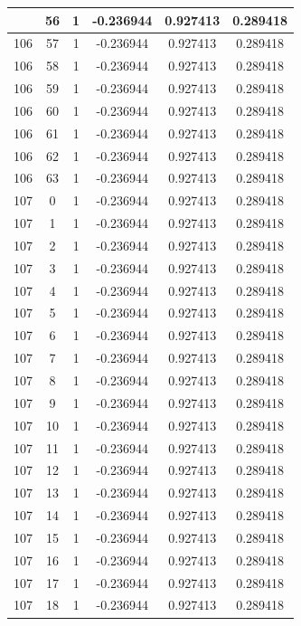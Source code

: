 \documentclass[12pt,a4paper]{article}
\numberwithin{equation}{section}
\numberwithin{figure}{section}
\numberwithin{table}{section}
\begin{document}
\begin{longtable}{|c|c|c|c|c|c|}
\pagebreak
106 & 56 & 1 & -0.236944 & 0.927413 & 0.289418 \\ \hline
106 & 57 & 1 & -0.236944 & 0.927413 & 0.289418 \\ \hline
106 & 58 & 1 & -0.236944 & 0.927413 & 0.289418 \\ \hline
106 & 59 & 1 & -0.236944 & 0.927413 & 0.289418 \\ \hline
106 & 60 & 1 & -0.236944 & 0.927413 & 0.289418 \\ \hline
106 & 61 & 1 & -0.236944 & 0.927413 & 0.289418 \\ \hline
106 & 62 & 1 & -0.236944 & 0.927413 & 0.289418 \\ \hline
106 & 63 & 1 & -0.236944 & 0.927413 & 0.289418 \\ \hline
107 & 0 & 1 & -0.236944 & 0.927413 & 0.289418 \\ \hline
107 & 1 & 1 & -0.236944 & 0.927413 & 0.289418 \\ \hline
107 & 2 & 1 & -0.236944 & 0.927413 & 0.289418 \\ \hline
107 & 3 & 1 & -0.236944 & 0.927413 & 0.289418 \\ \hline
107 & 4 & 1 & -0.236944 & 0.927413 & 0.289418 \\ \hline
107 & 5 & 1 & -0.236944 & 0.927413 & 0.289418 \\ \hline
107 & 6 & 1 & -0.236944 & 0.927413 & 0.289418 \\ \hline
107 & 7 & 1 & -0.236944 & 0.927413 & 0.289418 \\ \hline
107 & 8 & 1 & -0.236944 & 0.927413 & 0.289418 \\ \hline
107 & 9 & 1 & -0.236944 & 0.927413 & 0.289418 \\ \hline
107 & 10 & 1 & -0.236944 & 0.927413 & 0.289418 \\ \hline
107 & 11 & 1 & -0.236944 & 0.927413 & 0.289418 \\ \hline
107 & 12 & 1 & -0.236944 & 0.927413 & 0.289418 \\ \hline
107 & 13 & 1 & -0.236944 & 0.927413 & 0.289418 \\ \hline
107 & 14 & 1 & -0.236944 & 0.927413 & 0.289418 \\ \hline
107 & 15 & 1 & -0.236944 & 0.927413 & 0.289418 \\ \hline
107 & 16 & 1 & -0.236944 & 0.927413 & 0.289418 \\ \hline
107 & 17 & 1 & -0.236944 & 0.927413 & 0.289418 \\ \hline
107 & 18 & 1 & -0.236944 & 0.927413 & 0.289418 \\ \hline

\end{longtable}
\end{document}
